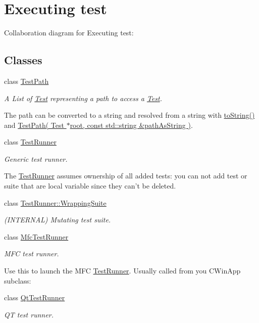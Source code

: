 \hypertarget{group___executing_test}{\section{Executing test}
\label{group___executing_test}
}
Collaboration diagram for Executing test\+:
\subsection*{Classes}
\begin{DoxyCompactItemize}
\item 
class \hyperlink{class_test_path}{Test\+Path}
\begin{DoxyCompactList}\small\item\em A List of \hyperlink{class_test}{Test} representing a path to access a \hyperlink{class_test}{Test}.

The path can be converted to a string and resolved from a string with \hyperlink{class_test_path_a81fd857b678a51a56db150b5c4d32971}{to\+String()} and \hyperlink{class_test_path_a5855701e39a328a19f9780a130106cb3}{Test\+Path( Test $\ast$root, const std\+::string \&path\+As\+String )}. \end{DoxyCompactList}\item 
class \hyperlink{class_test_runner}{Test\+Runner}
\begin{DoxyCompactList}\small\item\em Generic test runner.

The \hyperlink{class_test_runner}{Test\+Runner} assumes ownership of all added tests\+: you can not add test or suite that are local variable since they can't be deleted. \end{DoxyCompactList}\item 
class \hyperlink{class_test_runner_1_1_wrapping_suite}{Test\+Runner\+::\+Wrapping\+Suite}
\begin{DoxyCompactList}\small\item\em (I\+N\+T\+E\+R\+N\+A\+L) Mutating test suite. \end{DoxyCompactList}\item 
class \hyperlink{class_mfc_test_runner}{Mfc\+Test\+Runner}
\begin{DoxyCompactList}\small\item\em M\+F\+C test runner.

Use this to launch the M\+F\+C \hyperlink{class_test_runner}{Test\+Runner}. Usually called from you C\+Win\+App subclass\+: \end{DoxyCompactList}\item 
class \hyperlink{class_qt_test_runner}{Qt\+Test\+Runner}
\begin{DoxyCompactList}\small\item\em Q\+T test runner.


\end{DoxyCompactList}
\end{DoxyCompactItemize}
